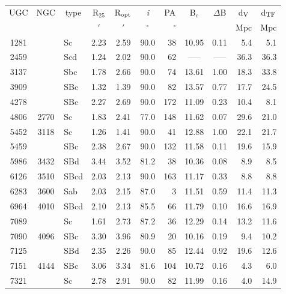 \documentclass{aa}
\begin{document}
\begin{center}
\begin{table}
\begin{center}
\begin{tabular}{cclcccrccrr}
\hline
UGC & NGC & \multicolumn{1}{c}{type} & R$_{25}$ & R$_{\rm opt}$ & {\it i} & 
\multicolumn{1}{c}{PA} & B$_c$ & $\Delta$B & \multicolumn{1}{c}{d$_{\rm V}$} & 
\multicolumn{1}{c}{d$_{\rm TF}$} \\
 &  &  & $'$ & $'$ & $^\circ$ & $^\circ$ & & & Mpc  & Mpc \\
\hline
\hline
1281 &    & Sc  &  2.23 &  2.59 &  90.0 &  38 &  10.95 &  0.11 &  5.4 &  5.1 \\
2459 &    & Scd &  1.24 &  2.02 &  90.0 &  62 &  ----- &  -----&  36.3& 36.3 \\
3137 &    & Sbc &  1.78 &  2.66 &  90.0 &  74 &  13.61 &  1.00 &  18.3& 33.8 \\
3909 &    & SBc &  1.32 &  1.39 &  90.0 &  82 &  13.57 &  0.77 &  17.7& 24.5 \\
4278 &    & SBc &  2.27 &  2.69 &  90.0 &  172&  11.09 &  0.23 &  10.4 & 8.1 \\
4806 &2770& Sc  &  1.83 &  2.41 &  77.0 &  148&  11.62 &  0.07 &  29.6 &21.0 \\
5452 &3118& Sc  &  1.26 &  1.41 &  90.0 &  41 &  12.88 &  1.00 &  22.1 &21.7 \\
5459 &   &  SBc &  2.38 &  2.67 &  90.0 &  132&  11.58 &  0.11 &  19.6 &15.9 \\
5986 &3432& SBd &  3.44 &  3.52 &  81.2 &  38 &  10.36 &  0.08 &  8.9 &  8.5 \\
6126 &3510& SBcd&  2.03 &  2.13 &  90.0 &  163&  11.17 &  0.33 &  8.8 &  8.8 \\
6283 &3600& Sab &  2.03 &  2.15 &  87.0 &  3 &  11.51 &  0.59 &  11.4 & 11.3 \\
6964 &4010& SBcd&  2.10 &  2.13 &  85.5 &  66&  11.79 &  0.10 &  16.6 & 16.9 \\
7089 &   &  Sc  &  1.61 &  2.73 &  87.2 &  36&  12.29 &  0.14 &  13.2 & 11.6 \\
7090 &   4096  &  SBc    	 &  3.30 &  3.96 &  80.9 &  20 &  10.16 &  0.19 &  9.4 &  10.2 \\
7125 &   &  SBd    	 &  2.35 &  2.26 &  90.0 &  85 &  12.44 &  0.92 &  19.6 &  12.6 \\
7151 &   4144  &  SBc    	 &  3.06 &  3.34 &  81.6 &  104 &  10.72 &  0.16 &  4.3 &  6.0 \\
7321 &   &  Sc     	 &  2.78 &  2.91 &  90.0 &  82 &  11.99 &  0.16 &  4.0 &  14.9 \\

\end{tabular}
\end{center}
\end{table}
\end{center}
\end{document}

